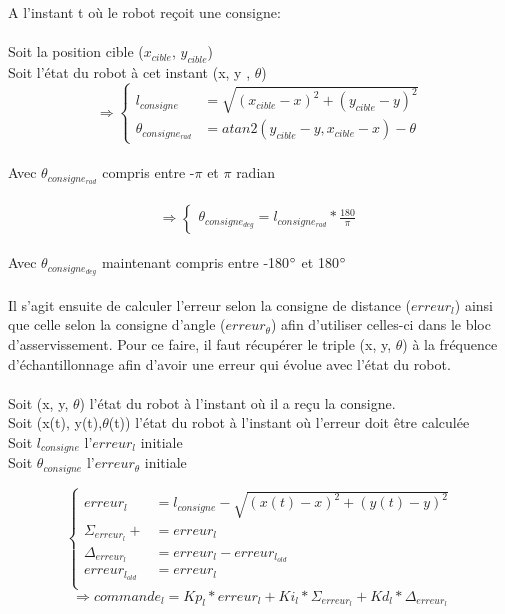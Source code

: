 \documentclass[a4paper,11pt]{article}
\begin{document}
A l'instant t où le robot reçoit une consigne:\\\\
Soit la position cible ($x_{cible}$, $y_{cible}$)\\
Soit l'état du robot à cet instant (x, y , $\theta$)
\begin{equation*}
    \Rightarrow\left\{
        \begin{aligned}
            l_{consigne} & = \sqrt{(x_{cible}-x)^2+(y_{cible}-y)^2}\\ 
            \theta_{consigne_{rad}} & = atan2(y_{cible}-y, x_{cible}-x)-\theta
        \end{aligned}
    \right.
\end{equation*}\\
Avec $\theta_{consigne_{rad}}$ compris entre -$\pi$ et $\pi$ radian\\\\
\begin{equation*}
    \Rightarrow\left\{
        \begin{aligned}
            \theta_{consigne_{deg}} = l_{consigne_{rad}}*\frac{180}{\pi}
        \end{aligned}
    \right.
\end{equation*}\\
Avec $\theta_{consigne_{deg}}$ maintenant compris entre -180$\degree$ et 180$\degree$\\\\
Il s'agit ensuite de calculer l'erreur selon la consigne de distance ($erreur_{l}$) ainsi que celle selon la consigne d'angle ($erreur_{\theta}$) afin d'utiliser celles-ci dans le bloc d'asservissement. Pour ce faire, il faut récupérer le triple (x, y, $\theta$) à la fréquence d'échantillonnage afin d'avoir une erreur qui évolue avec l'état du robot.\\\\
Soit (x, y, $\theta$) l'état du robot à l'instant où il a reçu la consigne.\\
Soit (x(t), y(t),$\theta$(t)) l'état du robot à l'instant où l'erreur doit être calculée\\
Soit $l_{consigne}$ l'$erreur_{l}$ initiale\\
Soit $\theta_{consigne}$ l'$erreur_{\theta}$ initiale

\begin{equation*}
    \left\{
        \begin{aligned}
            erreur_{l} & = l_{consigne} - \sqrt{(x(t)-x)^2+(y(t)-y)^2}\\
            \Sigma_{erreur_{l}} +&= erreur_{l}\\
            \Delta_{erreur_{l}} & = erreur_{l} - erreur_{l_{old}}\\
            erreur_{l_{old}} & = erreur_{l}\\
            \end{aligned}
    \right.
\end{equation*}
\begin{equation*}
    \Rightarrow commande_{l} =  Kp_{l}*erreur_{l}+Ki_{l}*\Sigma_{erreur_{l}}+Kd_{l}*\Delta_{erreur_{l}}
\end{equation*}
\end{document}

